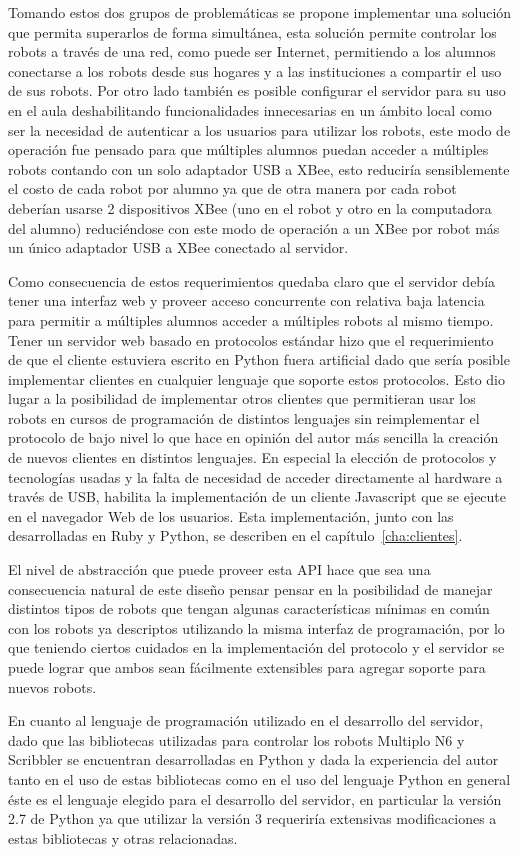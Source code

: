 Tomando estos dos grupos de problemáticas se propone implementar una solución
que permita
superarlos de forma simultánea, esta solución permite controlar los
robots a través de una red, como puede ser Internet, permitiendo a los alumnos
conectarse a los robots desde sus hogares y a las instituciones a compartir
el uso de sus robots. Por otro lado también es posible configurar el servidor
para su uso en el aula deshabilitando funcionalidades innecesarias en un ámbito
local como ser la necesidad de autenticar a los usuarios para utilizar los
robots, este modo de operación fue pensado para que múltiples alumnos puedan
acceder a múltiples robots contando con un solo adaptador USB a XBee, esto
reduciría sensiblemente el costo de cada robot por alumno ya que de otra
manera por cada robot deberían usarse 2 dispositivos XBee (uno en el robot
y otro en la computadora del alumno) reduciéndose con este modo de operación
a un XBee por robot más un único adaptador USB a XBee conectado al servidor.

Como consecuencia de estos requerimientos quedaba claro que el servidor
debía tener una interfaz web y proveer acceso concurrente con relativa
baja latencia para permitir a múltiples alumnos acceder a múltiples robots
al mismo tiempo.
Tener un servidor web basado en protocolos estándar hizo
que el requerimiento de que el cliente estuviera escrito en Python fuera
artificial dado que sería posible implementar clientes en cualquier lenguaje
que soporte estos protocolos. Esto dio lugar a la posibilidad de
implementar otros clientes que permitieran usar los robots en cursos
de programación de distintos lenguajes sin reimplementar el protocolo
de bajo nivel lo que hace en opinión del autor más sencilla la creación
de nuevos clientes en distintos lenguajes.
En especial la elección de protocolos y tecnologías usadas
y la falta de necesidad de acceder directamente al hardware a través de USB,
habilita la implementación de un cliente Javascript que se ejecute en el
navegador Web de los usuarios. Esta implementación, junto con las desarrolladas
en Ruby y Python, se describen en el capítulo~\ref{cha:clientes}.

El nivel de abstracción que puede proveer esta API hace que sea
una consecuencia natural de este diseño pensar
pensar en la posibilidad de manejar distintos tipos de robots
que tengan algunas características mínimas en común con los robots ya
descriptos utilizando la misma interfaz de programación, por lo que
teniendo ciertos cuidados en la implementación del protocolo y el
servidor se puede lograr que ambos sean fácilmente extensibles para
agregar soporte para nuevos robots.

En cuanto al lenguaje de programación utilizado en el desarrollo del servidor,
dado que las bibliotecas utilizadas para controlar los robots Multiplo N6 y
Scribbler se encuentran desarrolladas en Python y dada la experiencia del autor
tanto en el uso de estas bibliotecas como en el uso del lenguaje Python en general
éste es el lenguaje elegido para el desarrollo del servidor, en particular la
versión 2.7 de Python ya que utilizar la versión 3 requeriría extensivas
modificaciones a estas bibliotecas y otras relacionadas.
